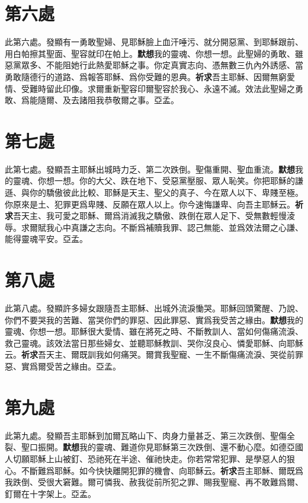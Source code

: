 \section*{第六處}
此第六處。發顯有一勇敢聖婦、見耶穌臉上血汗唾污、就分開惡黨、到耶穌跟前、用白帕擦其聖面、聖容就印在帕上。\cspace\textbf{默想}我的靈魂、你想一想。此聖婦的勇敢、雖惡黨眾多、不能阻她行此熱愛耶穌之事。你定真實志向、憑無數三仇內外誘感、當勇敢隨德行的道路、爲報答耶穌、爲你受難的恩典。\cspace\textbf{祈求}吾主耶穌、因爾無窮愛情、受難時留此印像。求爾重新聖容印爾聖容於我心、永遠不滅。效法此聖婦之勇敢、爲能隨爾、及去諸阻我恭敬爾之事。{\cspace}亞孟。

\section*{第七處}
此第七處。發顯吾主耶穌出城時力乏、第二次跌倒。聖傷重開、聖血重流。\cspace\textbf{默想}我的靈魂、你想一想。你的大父、跌在地下、受惡黨壓服、眾人恥笑。你把耶穌的謙遜、與你的驕傲彼此比較、耶穌是天主、聖父的真子、今在眾人以下、卑賤至極。你原來是土、犯罪更爲卑賤、反願在眾人以上。你今速悔謙卑、向吾主耶穌云。\cspace\textbf{祈求}吾天主、我可愛之耶穌、爾爲消滅我之驕傲、跌倒在眾人足下、受無數輕慢淩辱。求爾賦我心中真謙之志向。不斷爲補贖我罪、認己無能、並爲效法爾之心謙、能得靈魂平安。{\cspace}亞孟。

\section*{第八處}
此第八處。發顯許多婦女跟隨吾主耶穌、出城外流淚慟哭。耶穌回頭驚醒、乃說、你們不要哭我的苦難、當哭你們的罪惡、因此罪惡、實爲我受苦之緣由。\cspace\textbf{默想}我的靈魂、你想一想。耶穌很大愛情、雖在將死之時、不斷教訓人、當如何傷痛流淚、救己靈魂。該效法當日那些婦女、並聽耶穌教訓、哭你沒良心、憐愛耶穌、向耶穌云。\cspace\textbf{祈求}吾天主、爾既訓我如何痛哭。爾賞我聖寵、一生不斷傷痛流淚、哭從前罪惡、實爲爾受苦之緣由。{\cspace}亞孟。

\section*{第九處}
此第九處。發顯吾主耶穌到加爾瓦略山下、肉身力量甚乏、第三次跌倒、聖傷全裂、聖口振開。\cspace\textbf{默想}我的靈魂、難道你見耶穌第三次跌倒、還不動心麼。如德亞國人切願耶穌上山被釘、恐祂死在半途、催祂快走。你若常常犯罪、是學惡人的狠心。不斷難爲耶穌。如今快快離開犯罪的機會、向耶穌云。\cspace\textbf{祈求}吾主耶穌、爾既爲我跌倒、受很大窘難。爾可憐我、赦我從前所犯之罪、賜我聖寵、再不敢難爲爾、釘爾在十字架上。{\cspace}亞孟。

